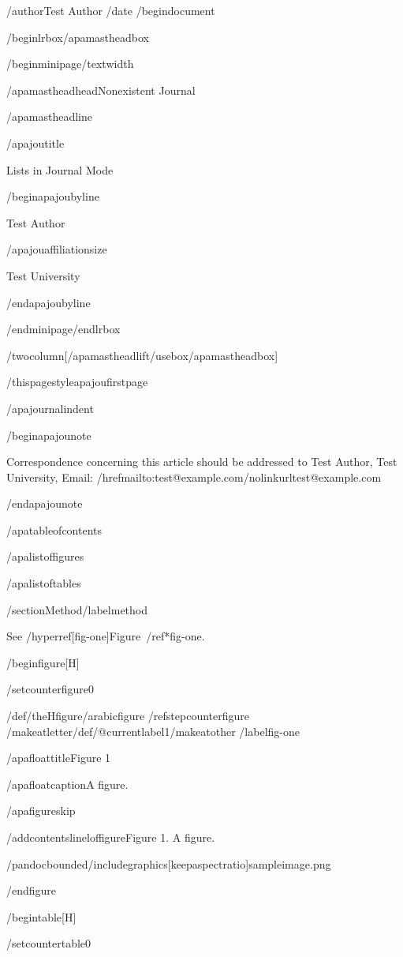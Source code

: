 /author{Test Author}
/date{}
/begin{document}


/begin{lrbox}{/apamastheadbox}%

/begin{minipage}{/textwidth}

/apamastheadhead{}{Nonexistent Journal}

/apamastheadline

/apajoutitle{

Lists in Journal Mode

}

/begin{apajoubyline}

Test Author

/apajouaffiliationsize

Test University

/end{apajoubyline}

/end{minipage}/end{lrbox}

/twocolumn[/apamastheadlift/usebox{/apamastheadbox}]

/thispagestyle{apajoufirstpage}

/apajournalindent

/begin{apajounote}

Correspondence concerning this article should be addressed to Test
Author, Test University, Email:
/href{mailto:test@example.com}{/nolinkurl{test@example.com}}

/end{apajounote}

/apatableofcontents

/apalistoffigures

/apalistoftables

/section{Method}/label{method}

See /hyperref[fig-one]{Figure~/ref*{fig-one}}.

/begin{figure}[H]

/setcounter{figure}{0}

/def/theHfigure{/arabic{figure}}%
/refstepcounter{figure}%
/makeatletter/def/@currentlabel{1}/makeatother%
/label{fig-one}

/apafloattitle{Figure 1}

/apafloatcaption{A figure.}

/apafigureskip

/addcontentsline{lof}{figure}{Figure 1. A figure.}

/pandocbounded{/includegraphics[keepaspectratio]{sampleimage.png}}

/end{figure}

/begin{table}[H]

/setcounter{table}{0}

